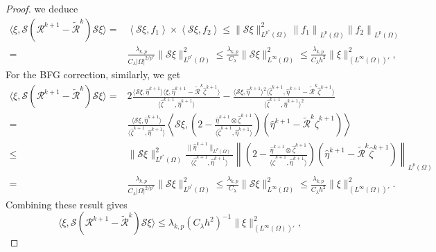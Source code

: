\documentclass[10pt,a4paper]{amsart}
\begin{document}
\begin{proof}
we deduce 
\begin{align*}
\langle \xi, \mathcal{S}(\mathcal{R}^{k+1} - \widetilde{\mathcal{R}}^{k})\mathcal{S}\xi \rangle=&\left\langle \mathcal{S}\xi,f_{1} \right\rangle\times \left\langle \mathcal{S}\xi, f_{2}\right\rangle\leq \|\mathcal{S}\xi\|_{L^{p^{*}}(\Omega)}^{2} \left\|f_{1} \right\|_{L^{p}(\Omega)}
\left\|f_{2} \right\|_{L^{p}(\Omega)} \\
=& \frac{\lambda_{k,p}}{C_{\lambda}|\Omega|^{2/p^{*}}}\|\mathcal{S}\xi\|_{L^{p^{*}}(\Omega)}^{2} \leq \frac{\lambda_{k,p}}{C_{\lambda}}\|\mathcal{S}\xi\|_{L^{\infty}(\Omega)}^{2} \leq\frac{\lambda_{k,p}}{C_{\lambda}h^{2}}\|\xi\|_{(L^{\infty}(\Omega))'}^{2},
\end{align*}
For the BFG correction, similarly, we get
\begin{align*}
\langle \xi, \mathcal{S}(\mathcal{R}^{k+1} - \widetilde{\mathcal{R}}^{k})\mathcal{S}\xi \rangle
=& 2 \frac{\langle \mathcal{S}\xi, \hat{\eta}^{k+1} \rangle \langle \xi, \hat{\eta}^{k+1} - \widetilde{\mathcal{R}}^{k}\hat{\zeta}^{k+1} \rangle}{\langle \hat{\zeta}^{k+1}, \hat{\eta}^{k+1} \rangle} - \frac{\langle \mathcal{S}\xi, \hat{\eta}^{k+1} \rangle^{2} \langle \hat{\zeta}^{k+1}, \hat{\eta}^{k+1} - \widetilde{\mathcal{R}}^{k}\hat{\zeta}^{k+1} \rangle}{\langle \hat{\zeta}^{k+1}, \hat{\eta}^{k+1} \rangle^{2}} \\
=& \frac{\langle \mathcal{S}\xi, \hat{\eta}^{k+1} \rangle}{\langle \hat{\zeta}^{k+1}, \hat{\eta}^{k+1} \rangle} \left\langle \mathcal{S}\xi, \left(2 - \frac{\hat{\eta}^{k+1} \otimes \hat{\zeta}^{k+1}}{\langle \hat{\zeta}^{k+1}, \hat{\eta}^{k+1} \rangle}\right)\left(\hat{\eta}^{k+1} - \widetilde{\mathcal{R}}^{k}\hat{\zeta}^{k+1}\right) \right\rangle \\
\leq& \|\mathcal{S}\xi\|_{L^{p^{*}}(\Omega)}^{2} \frac{\|\hat{\eta}^{k+1}\|_{L^{p}(\Omega)}}{\langle \hat{\zeta}^{k+1}, \hat{\eta}^{k+1} \rangle} \left\| \left(2 - \frac{\hat{\eta}^{k+1} \otimes \hat{\zeta}^{k+1}}{\langle \hat{\zeta}^{k+1}, \hat{\eta}^{k+1} \rangle}\right)\left(\hat{\eta}^{k+1} - \widetilde{\mathcal{R}}^{k}\hat{\zeta}^{k+1}\right) \right\|_{L^{p}(\Omega)} \\
=& \frac{\lambda_{k,p}}{C_{\lambda}|\Omega|^{2/p^{*}}}\|\mathcal{S}\xi\|_{L^{p^{*}}(\Omega)}^{2} \leq \frac{\lambda_{k,p}}{C_{\lambda}}\|\mathcal{S}\xi\|_{L^{\infty}(\Omega)}^{2} \leq\frac{\lambda_{k,p}}{C_{\lambda}h^{2}}\|\xi\|_{(L^{\infty}(\Omega))'}^{2}.
\end{align*}
Combining these result gives 
$$\langle \xi, \mathcal{S}(\mathcal{R}^{k+1} - \widetilde{\mathcal{R}}^{k})\mathcal{S}\xi \rangle \leq \lambda_{k,p}\left(C_{\lambda}h^{2}\right)^{-1}\|\xi\|_{(L^{\infty}(\Omega))'}^{2},$$ 

\end{proof}
\end{document}
